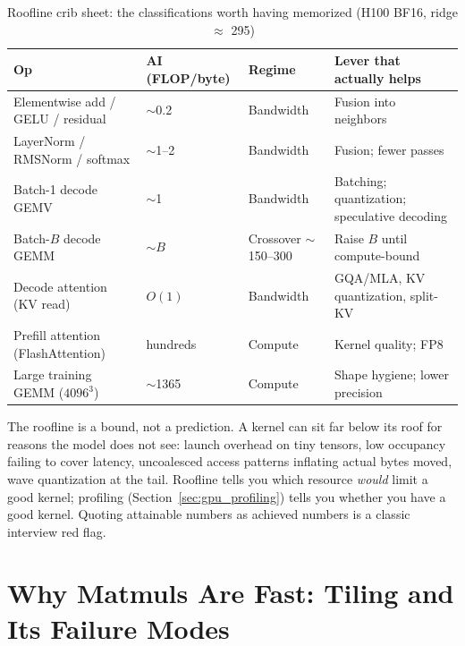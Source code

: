 \begin{table}[H]
\centering
\small
\caption{Roofline crib sheet: the classifications worth having memorized (H100 BF16, ridge $\approx$ 295)}
\label{tab:roofline_crib}
\begin{tabularx}{\textwidth}{lllX}
\toprule
\textbf{Op} & \textbf{AI (FLOP/byte)} & \textbf{Regime} & \textbf{Lever that actually helps} \\
\midrule
Elementwise add / GELU / residual & $\sim$0.2 & Bandwidth & Fusion into neighbors \\
LayerNorm / RMSNorm / softmax & $\sim$1--2 & Bandwidth & Fusion; fewer passes \\
Batch-1 decode GEMV & $\sim$1 & Bandwidth & Batching; quantization; speculative decoding \\
Batch-$B$ decode GEMM & $\sim B$ & Crossover $\sim$150--300 & Raise $B$ until compute-bound \\
Decode attention (KV read) & $O(1)$ & Bandwidth & GQA/MLA, KV quantization, split-KV \\
Prefill attention (FlashAttention) & hundreds & Compute & Kernel quality; FP8 \\
Large training GEMM ($4096^3$) & $\sim$1365 & Compute & Shape hygiene; lower precision \\
\bottomrule
\end{tabularx}
\end{table}

\begin{warningbox}
The roofline is a bound, not a prediction. A kernel can sit far below its roof for reasons the model does not see: launch overhead on tiny tensors, low occupancy failing to cover latency, uncoalesced access patterns inflating actual bytes moved, wave quantization at the tail. Roofline tells you which resource \textit{would} limit a good kernel; profiling (Section~\ref{sec:gpu_profiling}) tells you whether you have a good kernel. Quoting attainable numbers as achieved numbers is a classic interview red flag.
\end{warningbox}

\section{Why Matmuls Are Fast: Tiling and Its Failure Modes}
\label{sec:gpu_matmul}

